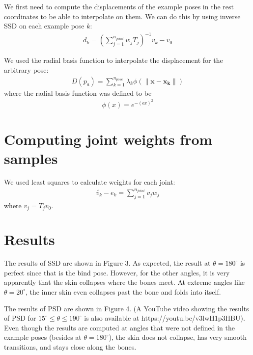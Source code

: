 \documentclass[10pt,twocolumn,letterpaper]{article}
\begin{document}
We first need to compute the displacements of the example poses in the rest coordinates to be able to interpolate on them. We can do this by using inverse SSD on each example pose $k$:
\begin{align} d_k = (\sum_{j=1}^{n_{joint}} w_j T_j)^{-1} v_k - v_0 \end{align}

We used the radial basis function to interpolate the displacement for the arbitrary pose:
\begin{align} D(p_a) = \sum_{k=1}^{n_{pose}} \lambda_k \phi(\| \mathbf{x} - \mathbf{x_k} \| ) \end{align}
where the radial basis function was defined to be
\begin{align} \phi(x) = e^{-(\epsilon x)^2} \end{align}

\section{Computing joint weights from samples}

We used least squares to calculate weights for each joint:
\begin{align} \widetilde{v_k} - e_k  = \sum_{j=1}^{n_{joint}} v_j w_j \end{align}
where $v_j = T_j v_0$.

\section{Results}

The results of SSD are shown in Figure 3. As expected, the result at $\theta = 180^{\circ}$ is perfect since that is the bind pose. However, for the other angles, it is very apparently that the skin collapses where the bones meet. At extreme angles like $\theta = 20^{\circ}$, the inner skin even collapses past the bone and folds into itself.

The results of PSD are shown in Figure 4. (A YouTube video showing the results of PSD for $15^{\circ} \leq \theta \leq 190^{\circ}$ is also available at https://youtu.be/v3lwH1p3HBU). Even though the results are computed at angles that were not defined in the example poses (besides at $\theta = 180^{\circ}$), the skin does not collapse, has very smooth transitions, and stays close along the bones.
\end{document}
